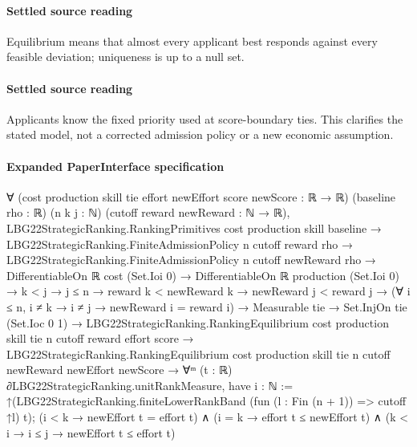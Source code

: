 \documentclass[10pt]{article}
\begin{document}
\paragraph{Settled source reading}
\begin{sloppypar}
Equilibrium means that almost every applicant best responds against every feasible deviation;\allowbreak{} uniqueness is up to a null set.\allowbreak{}
\end{sloppypar}
\paragraph{Settled source reading}
\begin{sloppypar}
Applicants know the fixed priority used at score-\allowbreak{}boundary ties.\allowbreak{} This clarifies the stated model, not a corrected admission policy or a new economic assumption.\allowbreak{}
\end{sloppypar}

\paragraph{Expanded PaperInterface specification}
\begin{ReviewVerbatim}
∀ (cost production skill tie effort newEffort score newScore : ℝ → ℝ) (baseline rho : ℝ) (n k j : ℕ)
  (cutoff reward newReward : ℕ → ℝ),
  LBG22StrategicRanking.RankingPrimitives cost production skill baseline →
    LBG22StrategicRanking.FiniteAdmissionPolicy n cutoff reward rho →
      LBG22StrategicRanking.FiniteAdmissionPolicy n cutoff newReward rho →
        DifferentiableOn ℝ cost (Set.Ioi 0) →
          DifferentiableOn ℝ production (Set.Ioi 0) →
            k < j →
              j ≤ n →
                reward k < newReward k →
                  newReward j < reward j →
                    (∀ i ≤ n, i ≠ k → i ≠ j → newReward i = reward i) →
                      Measurable tie →
                        Set.InjOn tie (Set.Ioc 0 1) →
                          LBG22StrategicRanking.RankingEquilibrium cost production skill tie n cutoff reward effort
                              score →
                            LBG22StrategicRanking.RankingEquilibrium cost production skill tie n cutoff newReward
                                newEffort newScore →
                              ∀ᵐ (t : ℝ) ∂LBG22StrategicRanking.unitRankMeasure,
                                have i : ℕ :=
                                  ↑(LBG22StrategicRanking.finiteLowerRankBand (fun (l : Fin (n + 1)) => cutoff ↑l) t);
                                (i < k → newEffort t = effort t) ∧
                                  (i = k → effort t ≤ newEffort t) ∧ (k < i → i ≤ j → newEffort t ≤ effort t)
\end{ReviewVerbatim}
\end{document}
